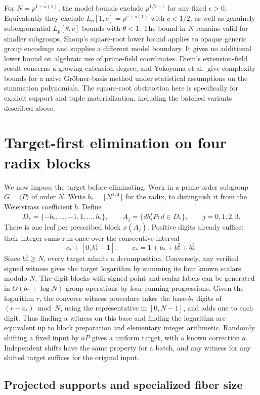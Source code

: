 \documentclass[11pt]{article}
\begin{document}
For \(N=p^{1+o(1)}\), the model bounds exclude \(p^{1/2-\epsilon}\) for any fixed \(\epsilon>0\). Equivalently they exclude \(L_p[1,c]=p^{c+o(1)}\) with \(c<1/2\), as well as genuinely subexponential \(L_p[\theta,c]\) bounds with \(\theta<1\). The bound in \(N\) remains valid for smaller subgroups. Shoup's square-root lower bound applies to opaque generic group encodings and supplies a different model boundary. It gives no additional lower bound on algebraic use of prime-field coordinates. Diem's extension-field result concerns a growing extension degree, and Yokoyama et al.\ give complexity bounds for a naive Gr\"obner-basis method under statistical assumptions on the summation polynomials. The square-root obstruction here is specifically for explicit support and tuple materialization, including the batched variants described above. \cite{shoup,diem,yokoyama}

\section{Target-first elimination on four radix blocks}

We now impose the target before eliminating. Work in a prime-order subgroup \(G=\langle P\rangle\) of order \(N\). Write \(b_*=\lceil N^{1/4}\rceil\) for the radix, to distinguish it from the Weierstrass coefficient \(b\). Define
\[
 D_*=\{-b_*,\ldots,-1,1,\ldots,b_*\},\qquad
 A_j=\{d b_*^jP:d\in D_*\},\qquad j=0,1,2,3.
\]
There is one leaf per prescribed block \(x(A_j)\). Positive digits already suffice: their integer sums run once over the consecutive interval
\[
  c_*+[0,b_*^4-1],\qquad c_*=1+b_*+b_*^2+b_*^3.
\tag{9}
\]
Since \(b_*^4\ge N\), every target admits a decomposition. Conversely, any verified signed witness gives the target logarithm by summing its four known scalars modulo \(N\). The digit blocks with signed point and scalar labels can be generated in \(O(b_*+\log N)\) group operations by four running progressions. Given the logarithm \(r\), the converse witness procedure takes the base-\(b_*\) digits of \((r-c_*)\bmod N\), using the representative in \([0,N-1]\), and adds one to each digit. Thus finding a witness on this base and finding the logarithm are equivalent up to block preparation and elementary integer arithmetic. Randomly shifting a fixed input by \(aP\) gives a uniform target, with a known correction \(a\). Independent shifts have the same property for a batch, and any witness for any shifted target suffices for the original input.

\subsection*{Projected supports and specialized fiber size}
\end{document}
